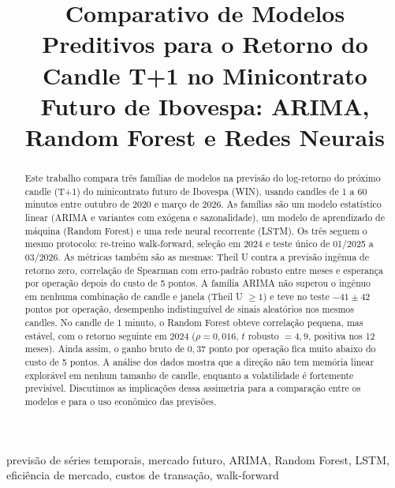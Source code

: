 \documentclass[conference]{IEEEtran}
\begin{document}
\title{Comparativo de Modelos Preditivos para o Retorno do Candle T+1 no Minicontrato Futuro de Ibovespa: ARIMA, Random Forest e Redes Neurais}

\author{
}

\maketitle

\begin{abstract}
Este trabalho compara três famílias de modelos na previsão do log-retorno do próximo candle (T+1) do minicontrato futuro de Ibovespa (WIN), usando candles de 1 a 60 minutos entre outubro de 2020 e março de 2026. As famílias são um modelo estatístico linear (ARIMA e variantes com exógena e sazonalidade), um modelo de aprendizado de máquina (Random Forest) e uma rede neural recorrente (LSTM). Os três seguem o mesmo protocolo: re-treino walk-forward, seleção em 2024 e teste único de 01/2025 a 03/2026. As métricas também são as mesmas: Theil U contra a previsão ingênua de retorno zero, correlação de Spearman com erro-padrão robusto entre meses e esperança por operação depois do custo de 5 pontos. A família ARIMA não superou o ingênuo em nenhuma combinação de candle e janela (Theil U $\geq 1$) e teve no teste $-41 \pm 42$ pontos por operação, desempenho indistinguível de sinais aleatórios nos mesmos candles. No candle de 1 minuto, o Random Forest obteve correlação pequena, mas estável, com o retorno seguinte em 2024 ($\rho = 0{,}016$, $t$ robusto $= 4{,}9$, positiva nos 12 meses). Ainda assim, o ganho bruto de $0{,}37$ ponto por operação fica muito abaixo do custo de 5 pontos. A análise dos dados mostra que a direção não tem memória linear explorável em nenhum tamanho de candle, enquanto a volatilidade é fortemente previsível. Discutimos as implicações dessa assimetria para a comparação entre os modelos e para o uso econômico das previsões.
\end{abstract}

\begin{IEEEkeywords}
previsão de séries temporais, mercado futuro, ARIMA, Random Forest, LSTM, eficiência de mercado, custos de transação, walk-forward
\end{IEEEkeywords}
\end{document}
